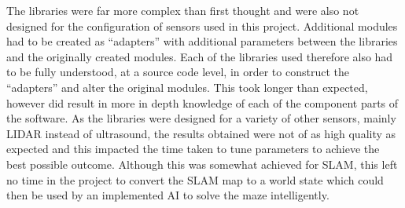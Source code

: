 The libraries were far more complex than first thought and were also not designed for 
the configuration of sensors used in this project. Additional modules had to be 
created as ``adapters'' with additional parameters between the libraries and the 
originally created modules. Each of the libraries used therefore also had to be fully 
understood, at a source code level, in order to construct the ``adapters'' and alter 
the original modules. This took longer than expected, however did result in more in 
depth knowledge of each of the component parts of the software. As the libraries were 
designed for a variety of other sensors, mainly LIDAR instead of ultrasound, the 
results obtained were not of as high quality as expected and this impacted the time 
taken to tune parameters to achieve the best possible outcome. Although this was 
somewhat achieved for SLAM, this left no time in the project to convert the SLAM map 
to a world state which could then be used by an implemented AI to solve the maze 
intelligently. 


